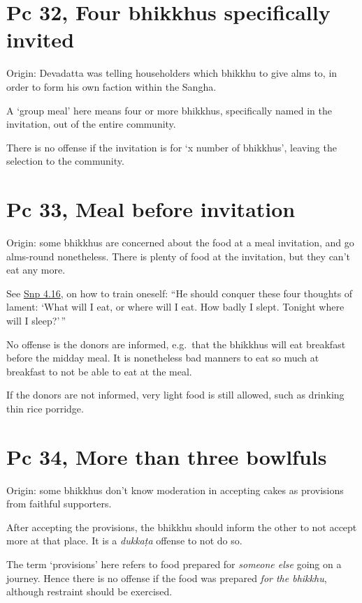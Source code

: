 \section{Pc 32, Four bhikkhus specifically invited}

Origin: Devadatta was telling householders which bhikkhu to give alms
to, in order to form his own faction within the Sangha.

A `group meal' here means four or more bhikkhus, specifically named in
the invitation, out of the entire community.

There is no offense if the invitation is for `x number of bhikkhus',
leaving the selection to the community.

\section{Pc 33, Meal before invitation}

Origin: some bhikkhus are concerned about the food at a meal invitation,
and go alms-round nonetheless. There is plenty of food at the
invitation, but they can't eat any more.

See
\href{https://www.accesstoinsight.org/tipitaka/kn/snp/snp.4.16.than.html}{Snp
4.16}, on how to train oneself: ``He should conquer these four thoughts
of lament: `What will I eat, or where will I eat. How badly I slept.
Tonight where will I sleep?'\,''

No offense is the donors are informed, e.g.~that the bhikkhus will eat
breakfast before the midday meal. It is nonetheless bad manners to eat
so much at breakfast to not be able to eat at the meal.

If the donors are not informed, very light food is still allowed, such
as drinking thin rice porridge.

\clearpage

\section{Pc 34, More than three bowlfuls}

Origin: some bhikkhus don't know moderation in accepting cakes as
provisions from faithful supporters.

\enlargethispage{\baselineskip}

After accepting the provisions, the bhikkhu should inform the other to
not accept more at that place. It is a \emph{dukkaṭa} offense to not do
so.

The term `provisions' here refers to food prepared for \emph{someone
else} going on a journey. Hence there is no offense if the food was
prepared \emph{for the bhikkhu}, although restraint should be exercised.

